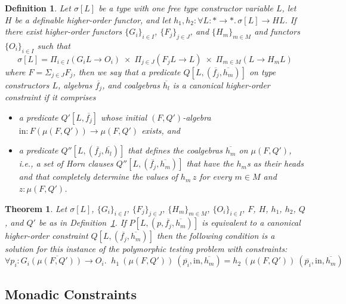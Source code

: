 \documentclass{article}[12 pt]
\newtheorem{thm}{Theorem}
\newtheorem{definition}{Definition}
\theoremstyle{problemstyle}
\begin{document}
\begin{definition}\label{def:hcan-cons}
Let $\sigma[L]$ be a type with one free type constructor variable $L$,
let $H$ be a definable higher-order functor, and let $h_1, h_2 :
\forall L :
* \rightarrow *.\, \sigma[L] \to H L$.  If there exist higher-order functors
$\{G_i\}_{i \in I}$, $\{F_j\}_{j \in J}$, and $\{H_m\}_{m \in M}$ and
functors $\{O_i\}_{i \in I}$ such that
\[\sigma[L] = \Pi_{i \in I} (G_i L \to O_i) \; \times
  \; \Pi_{j \in J} (F_j L \to L) \; \times \; \Pi_{m \in M} (L \to H_m
  L)\] where $F = \Sigma_{j \in J} F_j$, then we say that a predicate
  $Q[L, (\overline{f_j}, \overline{h_m})]$ on type constructors $L$,
  algebras $\overline{f_j}$, and coalgebras $\overline{h_l}$ is a {\em
    canonical higher-order constraint} if it comprises
\begin{itemize}
\item a predicate $Q'[L,\overline{f_j}]$ whose initial
  $(F,Q')$-algebra $\mathrm{in} : F (\mu (F,Q')) \to \mu (F,Q')$
  exists, and
\item a predicate $Q''[L, (\overline{f_j},\overline{h_l})]$ that
  defines the coalgebras $\overline{h_m}$ on $\mu (F,Q')$, i.e., a set
  of Horn clauses $Q''[L, (\overline{f_j},\overline{h_m})]$ that
  have the $h_m$s as their heads and that completely determine the
  values of $h_m\,z$ for every $m \in M$ and $z : \mu(F,Q')$. 
\end{itemize}
\end{definition}
\noindent

\begin{thm}\label{thm:ext-constraints} 
Let $\sigma[L]$, $\{G_i\}_{i \in I}$, $\{F_j\}_{j \in J}$, $\{H_m\}_{m
  \in M}$, $\{O_i\}_{i \in I}$, $F$, $H$, $h_1$, $h_2$, $Q$, and $Q'$
be as in Definition~\ref{def:hcan-cons}. If $P[L,
  (p,\overline{f_j},\overline{h_m})]$ is equivalent to a canonical
higher-order constraint $Q[L,(\overline{f_j},\overline{h_m})]$ then
the following condition is a solution for this instance of the
polymorphic testing problem with constraints:
\begin{equation}\label{eq:solution-constraints-2}
  \forall \overline{p_i : G_i (\mu (F,Q')) \to O_i}.\;\;
 h_1~(\mu (F,Q'))~(\overline{p_i}, \mathrm{in},\overline{h_m}) =
 h_2~(\mu (F,Q'))~(\overline{p_i}, \mathrm{in},\overline{h_m}) 
\end{equation}
\end{thm}
\noindent

\subsection{Monadic Constraints}
\end{document}
